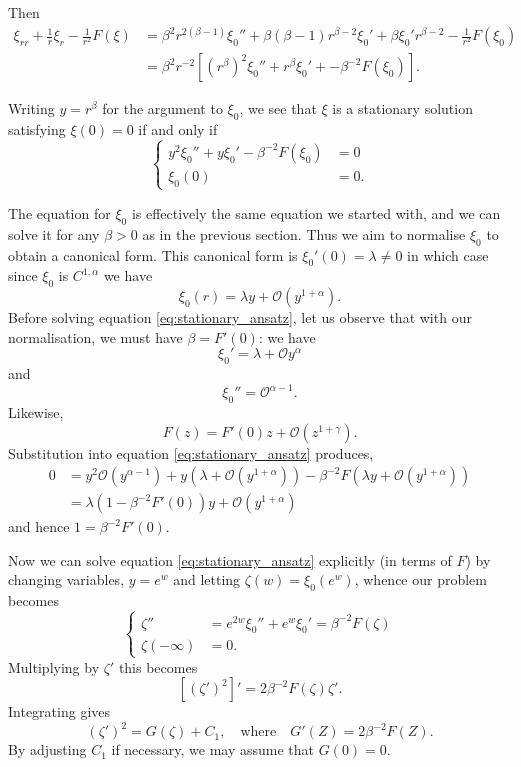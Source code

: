 \documentclass{amsart}
\begin{document}
Then
\[
\begin{split}
\xi_{rr} + \frac{1}{r} \xi_r - \frac{1}{r^2} F(\xi) &= \beta^2 r^{2(\beta-1)} \xi_0'' + \beta (\beta - 1) r^{\beta-2} \xi_0' + \beta \xi_0' r^{\beta-2} - \frac{1}{r^2} F(\xi_0) \\
&= \beta^2 r^{-2} \left[(r^{\beta})^2 \xi_0'' + r^{\beta} \xi_0' + - \beta^{-2}F(\xi_0)\right].
\end{split}
\]

Writing \(y = r^{\beta}\) for the argument to \(\xi_0\), we see that \(\xi\) is a stationary solution satisfying \(\xi(0) = 0\) if and only if
\begin{equation}
\label{eq:stationary_ansatz}
\begin{cases}
y^2 \xi_0'' + y \xi_0' - \beta^{-2} F(\xi_0) &= 0 \\
\xi_0(0) &= 0.
\end{cases}
\end{equation}

The equation for \(\xi_0\) is effectively the same equation we started with, and we can solve it for any \(\beta > 0\) as in the previous section. Thus we aim to normalise \(\xi_0\) to obtain a canonical form. This canonical form is \(\xi_0'(0) = \lambda \ne 0\) in which case since \(\xi_0\) is \(C^{1,\alpha}\) we have
\[
\xi_0(r) = \lambda y + \mathcal{O}(y^{1+\alpha}).
\]
Before solving equation \eqref{eq:stationary_ansatz}, let us observe that with our normalisation, we must have \(\beta = F'(0)\): we have
\[
\xi_0' = \lambda + \mathcal{O}y^{\alpha}
\]
and
\[
\xi_0'' = \mathcal{O}^{\alpha-1}.
\]
Likewise,
\[
F(z) = F'(0) z + \mathcal{O}(z^{1+\gamma}).
\]
Substitution into equation \eqref{eq:stationary_ansatz} produces,
\[
\begin{split}
0 &= y^2 \mathcal{O}(y^{\alpha-1}) + y \left(\lambda + \mathcal{O}(y^{1+\alpha})\right) - \beta^{-2} F(\lambda y + \mathcal{O} (y^{1 + \alpha})) \\
&= \lambda(1 - \beta^{-2} F'(0)) y + \mathcal{O}(y^{1+\alpha})
\end{split}
\]
and hence \(1 = \beta^{-2} F'(0)\).

Now we can solve equation \eqref{eq:stationary_ansatz} explicitly (in terms of \(F\)) by changing variables, \(y = e^w\) and letting \(\zeta(w) = \xi_0(e^w)\), whence our problem becomes
\[
\begin{cases}
\zeta'' &= e^{2w} \xi_0'' + e^w \xi_0' = \beta^{-2} F(\zeta) \\
\zeta(-\infty) &= 0.
\end{cases}
\]
Multiplying by \(\zeta'\) this becomes
\[
[(\zeta')^2]' = 2 \beta^{-2} F(\zeta) \zeta'.
\]
Integrating gives
\[
(\zeta')^2 = G(\zeta) + C_1, \quad \text{where} \quad G'(Z) = 2\beta^{-2} F(Z).
\]
By adjusting \(C_1\) if necessary, we may assume that \(G(0) = 0\).
\end{document}
